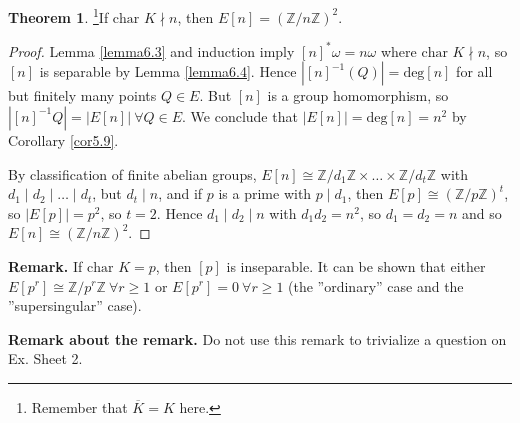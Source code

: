 \documentclass{article}
\theoremstyle{definition}
\newtheorem{theorem}{Theorem}[section]
\begin{document}
\begin{theorem}\label{theorem6.5}
    \footnote{Remember that $\overline{K} = K$ here.}If $\text{char }K \nmid n$, then $E[n] = (\mathbb{Z}/n\mathbb{Z})^2$.
\end{theorem}
\begin{proof}
    Lemma \ref{lemma6.3} and induction imply $[n]^* \omega = n \omega$ where $\text{char }K \nmid n$, so $[n]$ is separable by Lemma \ref{lemma6.4}. Hence $\left|[n]^{-1}(Q)\right| = \text{deg}[n]$ for all but finitely many points $Q \in E$. But $[n]$ is a group homomorphism, so $\left|[n]^{-1} Q\right| = \left|E[n]\right| ~\forall Q \in E$. We conclude that $\left|E[n]\right|=\text{deg}[n] = n^2$ by Corollary \ref{cor5.9}.
    \vspace{1mm}
     
    By classification of finite abelian groups, $E[n] \cong \mathbb{Z}/d_1\mathbb{Z} \times \ldots \times \mathbb{Z}/d_t\mathbb{Z}$ with $d_1 \mid d_2 \mid \ldots \mid d_t$, but $d_t \mid n$, and if $p$ is a prime with $p \mid d_1$, then $E[p] \cong (\mathbb{Z}/p\mathbb{Z})^t$, so $\left|E[p]\right| = p^2$, so $t=2$. Hence $d_1 \mid d_2 \mid n$ with $d_1d_2=n^2$, so $d_1=d_2=n$ and so $E[n] \cong (\mathbb{Z}/n\mathbb{Z})^2$.
\end{proof}
\textbf{Remark.} If $\text{char }K = p$, then $[p]$ is inseparable. It can be shown that either $E[p^r] \cong \mathbb{Z}/p^r \mathbb{Z} ~\forall r\ge 1$ or $E[p^r] = 0~\forall r\ge 1$ (the ''ordinary'' case and the ''supersingular'' case).

\textbf{Remark about the remark.} Do not use this remark to trivialize a question on Ex. Sheet 2.
\end{document}
